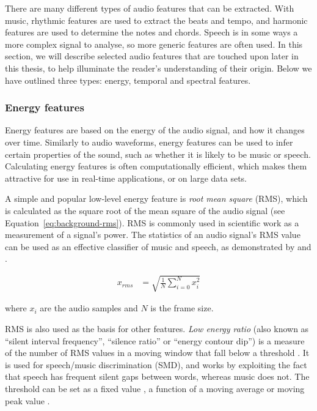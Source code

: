 There are many different types of audio features that can be extracted. With music, rhythmic features are used to
extract the beats and tempo, and harmonic features are used to determine the notes and chords.  Speech is in some ways
a more complex signal to analyse, so more generic features are often used.  In this section, we will describe selected
audio features that are touched upon later in this thesis, to help illuminate the reader's understanding of their
origin.  Below we have outlined three types: energy, temporal and spectral features.










\subsubsection{Energy features}

Energy features are based on the energy of the audio signal, and how it changes over time.  Similarly to audio
waveforms, energy features can be used to infer certain properties of the sound, such as whether it is likely to be
music or speech.  Calculating energy features is often computationally efficient, which makes them attractive for use
in real-time applications, or on large data sets.

A simple and popular low-level energy feature is \textit{root mean square} (RMS), which is calculated as the square
root of the mean square of the audio signal (see Equation~\ref{eq:background-rms}). RMS is commonly used in scientific
work as a measurement of a signal’s power.  The statistics of an audio signal's RMS value can be used as an effective
classifier of music and speech, as demonstrated by \citet{Ericsson2009} and \citet{Panagiotakis2005}.

\begin{align}
  x_{rms} &= \sqrt{\frac{1}{N} \displaystyle\sum\limits_{i=0}^{N} x_i^2}\label{eq:background-rms}
\end{align}

where $x_i$ are the audio samples and $N$ is the frame size.

RMS is also used as the basis for other features.  \textit{Low energy ratio} (also known as ``silent interval
frequency'', ``silence ratio'' or ``energy contour dip'') is a measure of the number of RMS values in a moving window
that fall below a threshold \citep{Liang2005}. It is used for speech/music discrimination (SMD), and works by
exploiting the fact that speech has frequent silent gaps between words, whereas music does not. The threshold can be
set as a fixed value \citep{Liang2005}, a function of a moving average \citep{Ericsson2009} or moving peak value
\citep{Saunders1996}.

